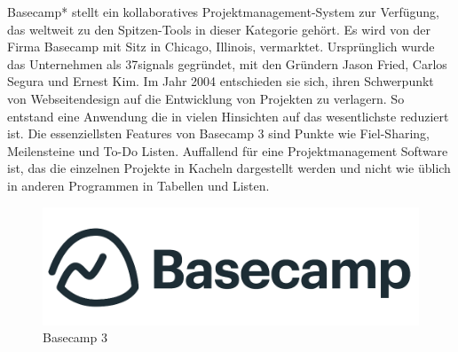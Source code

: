 Basecamp* stellt ein kollaboratives Projektmanagement-System zur Verfügung, das weltweit zu den Spitzen-Tools in dieser Kategorie gehört. Es wird von der Firma Basecamp mit Sitz in Chicago, Illinois, vermarktet. Ursprünglich wurde das Unternehmen als 37signals gegründet, mit den Gründern Jason Fried, Carlos Segura und Ernest Kim. Im Jahr 2004 entschieden sie sich, ihren Schwerpunkt von Webseitendesign auf die Entwicklung von Projekten zu verlagern.
So entstand eine Anwendung die in vielen Hinsichten auf das wesentlichste reduziert ist. Die essenziellsten Features von Basecamp 3 sind Punkte wie Fiel-Sharing, Meilensteine und To-Do Listen. Auffallend für eine Projektmanagement Software ist, das die einzelnen Projekte in Kacheln dargestellt werden und nicht wie üblich in anderen Programmen in Tabellen und Listen.


\begin{figure}[h!]
    \centering
    \includegraphics[width=0.7\linewidth]{pics/basecamp.png}
    \caption{Basecamp 3}
    \label{fig:enter-label}
\end{figure}





